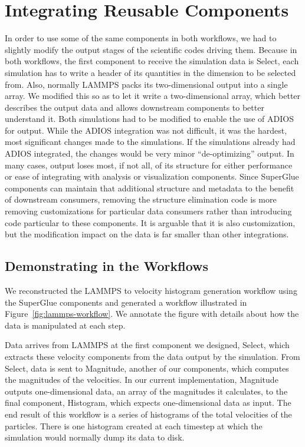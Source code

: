 \documentclass[conference]{IEEEtran}
\begin{document}
\section{Integrating Reusable Components}
\label{s:integrating-reusable-components}



In order to use some of the same components in both workflows, we had to
slightly modify the output stages of the scientific codes driving them. Because
in both workflows, the first component to receive the simulation data is
Select, each simulation has to write a header of its quantities in the
dimension to be selected from. Also, normally LAMMPS packs its two-dimensional
output into a single array. We modified this so as to let it write a
two-dimensional array, which better describes the output data and allows
downstream components to better understand it. Both simulations had to be
modified to enable the use of ADIOS for output. While the ADIOS integration was
not difficult, it was the hardest, most significant changes made to the
simulations. If the simulations already had ADIOS integrated, the changes would
be very minor ``de-optimizing'' output. In many cases, output loses most, if
not all, of its structure for either performance or ease of integrating with
analysis or visualization components. Since SuperGlue components can maintain
that additional structure and metadata to the benefit of downstream consumers,
removing the structure elimination code is more removing customizations for
particular data consumers rather than introducing code particular to these
components. It is arguable that it is also customization, but the modification
impact on the data is far smaller than other integrations.

\subsection{Demonstrating in the Workflows}

We reconstructed the LAMMPS to velocity histogram generation workflow using the
SuperGlue components and generated a workflow illustrated in
Figure~\ref{fig:lammps-workflow}. We annotate the figure with details about how
the data is manipulated at each step.


Data arrives from LAMMPS at the first component we designed, Select, which
extracts these velocity components from the data output by the simulation. From
Select, data is sent to Magnitude, another of our components, which computes
the magnitudes of the velocities. In our current implementation, Magnitude
outputs one-dimensional data, an array of the magnitudes it calculates, to the
final component, Histogram, which expects one-dimensional data as input. The
end result of this workflow is a series of histograms of the total velocities
of the particles. There is one histogram created at each timestep at which the
simulation would normally dump its data to disk.
\end{document}
